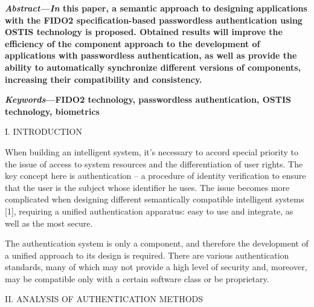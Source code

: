 \documentclass{article}
\begin{document}
\begin{multicols}{2}
\textbf{\textit{Abstract—In} this paper, a semantic approach to designing applications with the FIDO2 specification-based
passwordless authentication using OSTIS technology is
proposed. Obtained results will improve the efficiency of
the component approach to the development of applications
with passwordless authentication, as well as provide the
ability to automatically synchronize different versions of
components, increasing their compatibility and consistency.}
\par
\textbf{\textit{Keywords}—FIDO2 technology, passwordless authentication, OSTIS technology, biometrics}
\begin{center}
I. INTRODUCTION
\end{center}
\par
When building an intelligent system, it’s necessary
to accord special priority to the issue of access to
system resources and the differentiation of user rights.
The key concept here is authentication – a procedure
of identity verification to ensure that the user is the
subject whose identifier he uses. The issue becomes
more complicated when designing different semantically
compatible intelligent systems [1], requiring a unified
authentication apparatus: easy to use and integrate, as
well as the most secure.
\par
The authentication system is only a component, and
therefore the development of a unified approach to
its design is required. There are various authentication
standards, many of which may not provide a high level
of security and, moreover, may be compatible only with
a certain software class or be proprietary.
\begin{center}
II. ANALYSIS OF AUTHENTICATION METHODS



\end{center}
\end{multicols}
\end{document}
